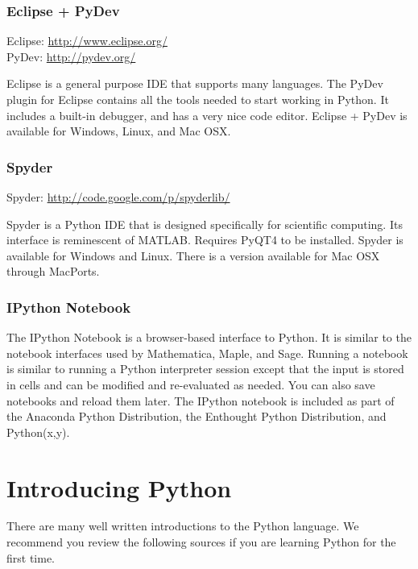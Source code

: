 \subsubsection*{Eclipse + PyDev}

Eclipse: \url{http://www.eclipse.org/} \\
PyDev: \url{http://pydev.org/}

Eclipse is a general purpose IDE that supports many languages.
The PyDev plugin for Eclipse contains all the tools needed to start working in Python.
It includes a built-in debugger, and has a very nice code editor.
Eclipse + PyDev is available for Windows, Linux, and Mac OSX.

\subsubsection*{Spyder}

Spyder: \url{http://code.google.com/p/spyderlib/}

Spyder is a Python IDE that is designed specifically for scientific computing.
Its interface is reminescent of MATLAB.
Requires PyQT4 to be installed.
Spyder is available for Windows and Linux.
There is a version available for Mac OSX through MacPorts.

\subsubsection*{IPython Notebook}
The IPython Notebook is a browser-based interface to Python.
It is similar to the notebook interfaces used by Mathematica, Maple, and Sage.
Running a notebook is similar to running a Python interpreter session except that
the input is stored in cells and can be modified and re-evaluated as needed.
You can also save notebooks and reload them later.
The IPython notebook is included as part of the Anaconda Python Distribution, the
Enthought Python Distribution, and Python(x,y).

\section*{Introducing Python}
There are many well written introductions to the Python language.
We recommend you review the following sources if you are learning Python for the
first time.

